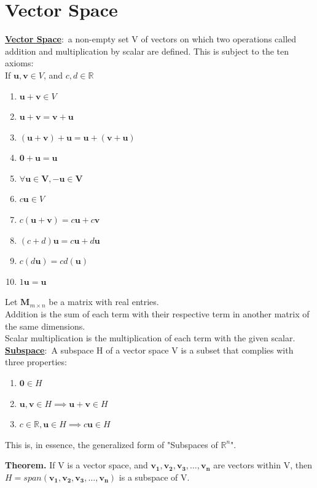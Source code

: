 \documentclass[nobib]{tufte-handout}
\newcommand{\defn}[2]{\underline{\noindent\textbf{#1}}:\ #2}
\begin{document}
\section{Vector Space}
\defn{Vector Space}{a non-empty set V of vectors on which two operations called addition and multiplication by scalar are defined. This is subject to the ten axioms:}\\
If $\mathbf{u,v}\in V$, and $c,d\in \mathbb{R}$
\begin{enumerate}
    \item $\mathbf{u+v}\in V$
    \item $\mathbf{u+v=v+u}$
    \item $\mathbf{(u+v)+u = u+(v+u)}$
    \item $\mathbf{0+u=u}$
    \item $\mathbf{\forall u \in \text{$V$}, -u\in \text{$V$}}$
    \item $c\mathbf{u}\in V$
    \item $c\mathbf{(u+v)} = c\mathbf{u}+c\mathbf{v}$
    \item $(c+d)\mathbf{u} = c\mathbf{u}+d\mathbf{u}$
    \item $c(d\mathbf{u}) = cd(\mathbf{u})$
    \item $1\mathbf{u=u}$
\end{enumerate}
Let $\mathbf{M}_{m\times n}$ be a matrix with real entries.\\
Addition is the sum of each term with their respective term in another matrix of the same dimensions.\\
Scalar multiplication is the multiplication of each term with the given scalar.\\
\defn{Subspace}{A subspace H of a vector space V is a subset that complies with three properties:}\\
\begin{enumerate}
    \item $\mathbf{0}\in H$
    \item $\mathbf{u,v}\in H \implies \mathbf{u+v}\in H$
    \item $c\in \mathbb{R}, \mathbf{u}\in H \implies c\mathbf{u}\in H$
\end{enumerate}
This is, in essence, the generalized form of "Subspaces of $\mathbb{R}^n$".\\
\begin{center}
    \textbf{Theorem.} If V is a vector space, and $\mathbf{v_1,v_2,v_3, \ldots, v_n}$ are vectors within V, then $H = span(\mathbf{v_1,v_2,v_3, \ldots, v_n})$ is a subspace of V.
\end{center}
\end{document}
